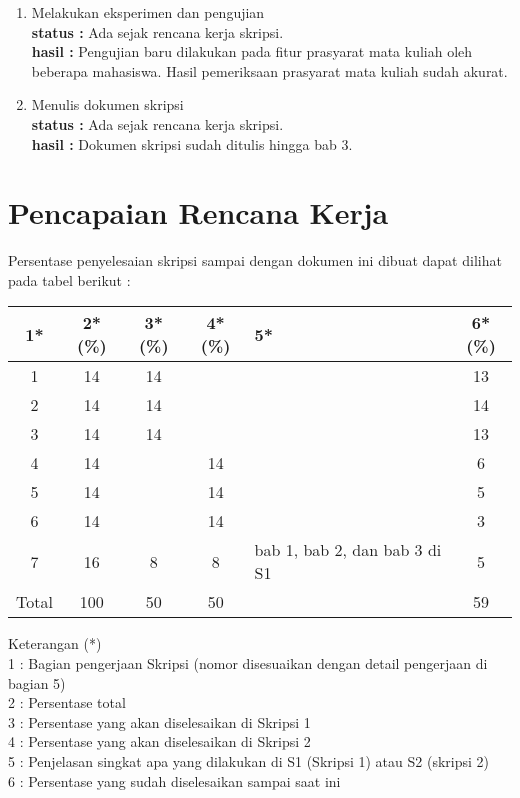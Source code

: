\documentclass[a4paper,twoside]{article}
\begin{document}
\begin{enumerate}
		\item Melakukan eksperimen dan pengujian\\
		{\bf status :} Ada sejak rencana kerja skripsi.\\
		{\bf hasil :} Pengujian baru dilakukan pada fitur prasyarat mata kuliah oleh beberapa mahasiswa. Hasil pemeriksaan prasyarat mata kuliah sudah akurat.

		\item Menulis dokumen skripsi\\
		{\bf status :} Ada sejak rencana kerja skripsi.\\
		{\bf hasil :} Dokumen skripsi sudah ditulis hingga bab 3.

	\end{enumerate}

\section{Pencapaian Rencana Kerja}
Persentase penyelesaian skripsi sampai dengan dokumen ini dibuat dapat dilihat pada tabel berikut :

\begin{center}
  \begin{tabular}{ | c | c | c | c | l | c |}
    \hline
    1*  & 2*(\%) & 3*(\%) & 4*(\%) &5* &6*(\%)\\ \hline \hline
   1   & 14  & 14  &  &  & 13\\ \hline
    2   & 14 & 14  &   &  & 14\\ \hline
    3   & 14  & 14  &  &  & 13\\ \hline
    4   & 14  &   &  14 &  & 6\\ \hline
    5   & 14  &   & 14 &  & 5\\ \hline
    6   & 14 &   & 14  &  & 3\\ \hline
    7   & 16  & 8  & 8 &  {\footnotesize bab 1, bab 2, dan bab 3 di S1} & 5\\ \hline
    Total  & 100  & 50  & 50 &  & 59\\ \hline
                          \end{tabular}										
\end{center}

Keterangan (*)\\
1 : Bagian pengerjaan Skripsi (nomor disesuaikan dengan detail pengerjaan di bagian 5)\\
2 : Persentase total \\
3 : Persentase yang akan diselesaikan di Skripsi 1 \\
4 : Persentase yang akan diselesaikan di Skripsi 2 \\
5 : Penjelasan singkat apa yang dilakukan di S1 (Skripsi 1) atau S2 (skripsi 2)\\
6 : Persentase yang sudah diselesaikan sampai saat ini 
\end{document}
